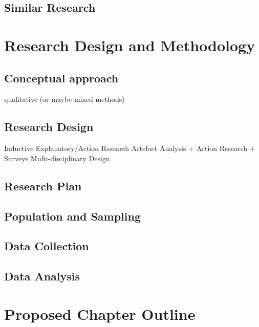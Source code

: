 \documentclass{article}
\begin{document}
\subsection{Similar Research}

\section{Research Design and Methodology}

\subsection{Conceptual approach}

qualitative (or maybe mixed methods)

\subsection{Research Design}
Inductive
Explanatory/Action Research
Artefact Analysis + Action Research + Surveys
Multi-disciplinary Design

\subsection{Research Plan}

\subsection{Population and Sampling}

\subsection{Data Collection}

\subsection{Data Analysis}

\section{Proposed Chapter Outline}
\end{document}
